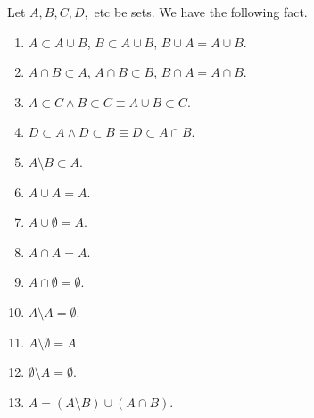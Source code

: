 \documentclass[a4paper,12pt]{article}
\begin{document}
\begin{prp}\label{prop:set_operation}
	\leavevmode \par \noindent
	Let \( A, B, C, D, \) etc be sets. We have the following fact.
	\begin{enumerate}
		\item \label{enu:set_basic_cup}
		      \( A \subset A \cup B \), \( B \subset A \cup B \), \( B \cup A = A \cup B \).
		      
		\item \label{enu:set_basic_cap}
		      \(A \cap B \subset A \), \(A \cap B \subset B \), \( B \cap A = A \cap B \).
		      
		\item \label{enu:set_basic_cup_bound}
		      \( A \subset C \wedge B \subset C \equiv A\cup B \subset C \).
		      
		\item \label{enu:set_basic_cap_bound}
		      \( D \subset A \wedge D \subset B \equiv D \subset A \cap B \).
		      
		\item \label{enu:set_basic_setminus_smaller}
		      \( A \setminus B \subset A \).
		      
		\item \label{enu:set_basic_trivial_cup}
		      \( A\cup A =A \).
		      
		\item \label{enu:set_basic_empty_cup}
		      \( A \cup \emptyset =A \).
		      
		\item \label{enu:set_basic_trivial_cap}
		      \( A \cap A =A \).
		      
		\item \label{enu:set_basic_empty_cap}
		      \( A \cap \emptyset = \emptyset\).
		      
		\item \label{enu:set_basic_setminus_itself}
		      \( A \setminus A = \emptyset \).
		      
		\item \label{enu:set_basic_itself_minus_empty}
		      \( A \setminus \emptyset = A \).
		      
		\item \label{enu:set_basic_empty_minus_itself}
		      \( \emptyset \setminus A = \emptyset \).
		      
		\item \label{enu:set_basic_decomposition}
		      \( A = (A \setminus B) \cup (A \cap B) \).
		      

\end{enumerate}
\end{prp}
\end{document}

